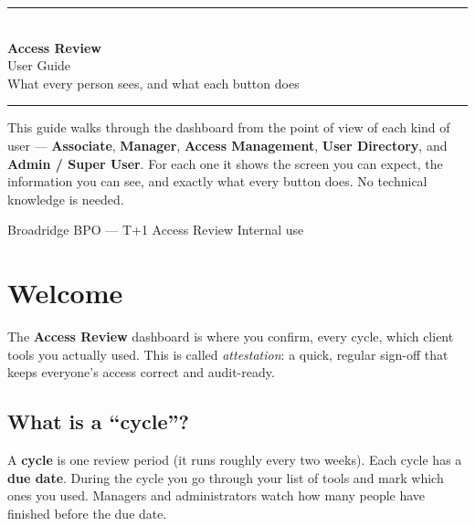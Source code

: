 \documentclass[11pt]{article}
\newcommand{\role}[1]{{\color{brandDark}\bfseries #1}}
\begin{document}
\begin{titlepage}
\thispagestyle{empty}
\centering
\vspace*{2.2cm}
{\color{brand}\rule{\linewidth}{2pt}}\\[6pt]
{\Huge\bfseries\color{brandDark} Access Review}\\[6pt]
{\LARGE\color{ink} User Guide}\\[10pt]
{\large\color{muted} What every person sees, and what each button does}\\[4pt]
{\color{brand}\rule{\linewidth}{2pt}}

\vfill
\begin{tcolorbox}[enhanced, width=0.85\linewidth, colback=soft, colframe=line,
   boxrule=0.6pt, arc=4pt, left=14pt, right=14pt, top=12pt, bottom=12pt]
\small
This guide walks through the dashboard from the point of view of each kind of
user --- \role{Associate}, \role{Manager}, \role{Access Management},
\role{User Directory}, and \role{Admin / Super User}. For each one it shows the
screen you can expect, the information you can see, and exactly what every button
does. No technical knowledge is needed.
\end{tcolorbox}
\vfill

{\small\color{muted} Broadridge BPO --- T+1 Access Review \quad\textbullet\quad Internal use}
\vspace*{1.5cm}
\end{titlepage}

\tableofcontents
\thispagestyle{fancy}
\clearpage

\section{Welcome}

The \textbf{Access Review} dashboard is where you confirm, every cycle, which
client tools you actually used. This is called \emph{attestation}: a quick,
regular sign-off that keeps everyone's access correct and audit-ready.

\subsection{What is a ``cycle''?}
A \textbf{cycle} is one review period (it runs roughly every two weeks). Each
cycle has a \textbf{due date}. During the cycle you go through your list of tools
and mark which ones you used. Managers and administrators watch how many people
have finished before the due date.
\end{document}
